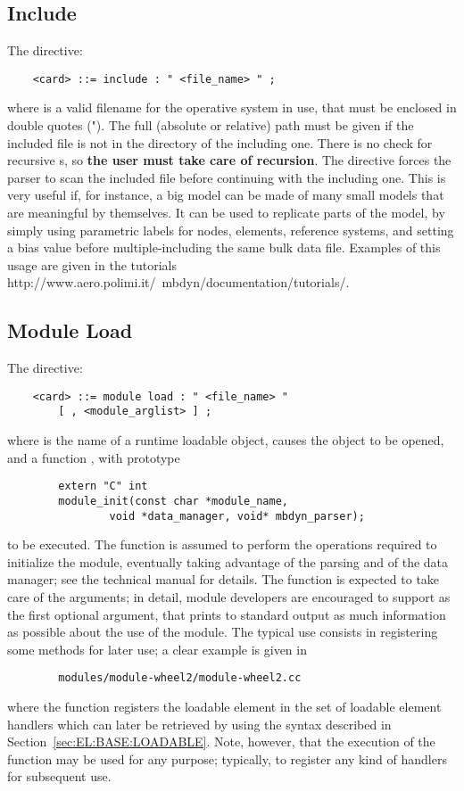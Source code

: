 \subsection{Include}
The  directive:
\begin{verbatim}
    <card> ::= include : " <file_name> " ;
\end{verbatim}
where  is a valid filename for the operative system in
use, that must be enclosed in double quotes (").
The full (absolute or relative) path must be given if the included file 
is not in the directory of the including one.
There is no check for recursive s, so 
{\bf the user must take care of recursion}.
The  directive forces the parser to scan the included file
 before continuing with the including one.
This is very useful if, for instance, a big model can be made of many
small models that are meaningful by themselves.
It can be used to replicate parts of the model, by simply using parametric 
labels for nodes, elements, reference systems, and setting a bias value 
before multiple-including the same bulk data file.
Examples of this usage are given in the tutorials
	{http://www.aero.polimi.it/~mbdyn/documentation/tutorials/}.



\subsection{Module Load}\label{sec:GENERAL:MODULE-LOAD}
The  directive:
\begin{verbatim}
    <card> ::= module load : " <file_name> "
        [ , <module_arglist> ] ;
\end{verbatim}
where  is the name of a runtime loadable object,
causes the object to be opened, and a function ,
with prototype
\begin{verbatim}
        extern "C" int
        module_init(const char *module_name,
                void *data_manager, void* mbdyn_parser);
\end{verbatim}
to be executed.
The function is assumed to perform the operations required to initialize
the module, eventually taking advantage of the parsing
and of the data manager; see the technical manual for details.
The function is expected to take care of the 
arguments; in detail, module developers are encouraged to support
 as the first optional argument, that prints to standard output
as much information as possible about the use of the module.
The typical use consists in registering some methods for later use;
a clear example is given in
\begin{verbatim}
        modules/module-wheel2/module-wheel2.cc
\end{verbatim}
where the function registers the loadable element in the set
of loadable element handlers which can later be retrieved by using
the syntax described in Section~\ref{sec:EL:BASE:LOADABLE}.
Note, however, that the execution of the  function 
may be used for any purpose; typically, to register any kind of handlers
for subsequent use.


